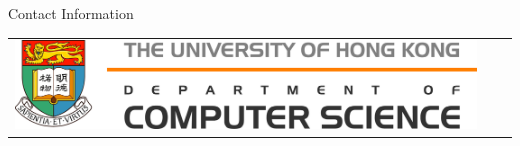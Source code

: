 \documentclass[final]{beamer}
\newlength{\onecolwid}
\begin{document}
\begin{frame}[t]
\begin{columns}[t]
\begin{column}{\onecolwid}
\begin{alertblock}{Contact Information}
\end{alertblock}

\begin{center}
\begin{tabular}{ccc}
\includegraphics[width=0.8\linewidth]{img/hkulogo} & \hfill &
\end{tabular}
\end{center}


\end{column} %

\end{columns} %

\end{frame} %
\end{document}
